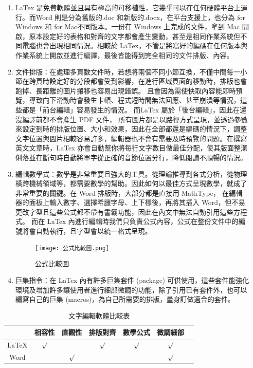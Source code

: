 \documentclass[14pt,a4paper]{report}  %
\begin{document}
{{{{{{		 \begin{enumerate}
		 \item LaTex 是免費軟體並且具有極高的可移植性，它幾乎可以在任何硬體平台上運行。而Word 則是分為舊版的.doc 和新版的.docx，在平台支援上，也分為 for Windows 和 for Mac不同版本。一份在 Windows 上完成的文件，拿到 Mac 開啟，原本設定好的表格和對齊的文字都會產生變動，甚至是相同作業系統但不同電腦也會出現相同情況。相較於 LaTex，不管是將寫好的編碼在任何版本與作業系統上開啟並進行編譯，最後皆能得到完全相同的文件排版、內容。
		 \item 文件排版：在處理多頁數文件時，若想將兩個不同小節互換，不僅中間每一小節在跨頁時設定好的分段都會受到影響，在進行區域頁面的移動時，排版也會跑掉、長距離的圖片搬移也容易出現錯誤。 且會因為需使快取內容能即時預覽，導致向下滑動時會發生卡頓、程式短時間無法回應、甚至崩潰等情況，這些都是「前台編輯」容易發生的情況。 而LaTex 屬於「後台編輯」，因此在還沒編譯前都不會產生 PDF 文件， 所有圖片都是以路徑方式呈現，並透過參數來設定到時的排版位置、大小和效果，因此在全部都還是編碼的情況下，調整 文字位置與圖片相較容易許多，編輯器也不會有需要及時預覽的問題。在撰寫英文文章時，LaTex 亦會自動幫你將每行文字數目做最佳分配，使其版面整潔俐落並在斷句時自動將單字從正確的音節位置分行，降低閱讀不順暢的情況。 
		\item 編輯數學式：數學是非常重要且強大的工具。從理論推導到各式分析，從物理橫跨機械領域等，都需要數學的幫助。因此如何以最佳方式呈現數學，就成了非常重要的關鍵。在 Word 排版時，大部分都是直接用 MathType， 在編輯器的面板上輸入數字、選擇希臘字母、上下標後，再將其插入 Word，但不易更改字型且這些公式都不帶有書籤功能，因此在內文中無法自動引用這些方程式。 而在 LaTex 內進行編輯時我們只負責公式內容，公式在整份文件中的編號將會自動執行，且字型會以統一格式呈現。
	
		
		\begin{figure}[H]
        \centering
        \texttt{[image: 公式比較圖.png]} 
        \caption{公式比較圖} 
		\label{fig_公式比較圖:scale}
    	\end{figure}
    	
		\item 巨集指令：在 LaTex 內有許多巨集套件 (package) 可供使用，這些套件能強化環境及增加許多讓使用者進行細部微調的功能，除了引用已有套件外，也可以編寫自己的巨集 (macros)，為自己所需要的排版，量身訂做適合的套件。
		\end{enumerate}    	
    	
		 \begin{table}[htbp] %
			\centering%
			\caption{文字編輯軟體比較表}%
			\large%
			\label{tab_文字編輯軟體比較表:scale}
			\begin{tabular}{|c|c|c|c|c|c|c|}
			\hline
			\diagbox[width=4em]& 相容性 & 直觀性 & 排版對齊 & 數學公式 & 微調細部\\ 
			\hline
			LaTeX 		&$\surd$&		&$\surd$&$\surd$&$\surd$\\
			\hline
			Word	 	&		&$\surd$&		&		&$\surd$\\
			\hline
			

\end{tabular}
\end{table}}}}}}}
\end{document}
